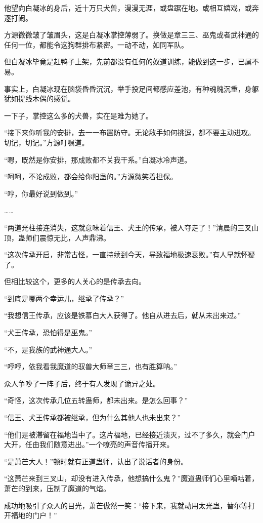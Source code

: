 \begin{this_body}
他望向白凝冰的身后，近十万只犬兽，漫漫无涯，或盘踞在地。或相互嬉戏，或奔逐打闹。

方源微微皱了皱眉头，这是白凝冰掌控薄弱了。换做是章三三、巫鬼或者武神通的任何一位，都能令这狗群排布紧密。一动不动，如同军队。

但白凝冰毕竟是赶鸭子上架，先前都没有任何的奴道训练，能做到这一步，已属不易。

事实上，白凝冰现在脑袋昏昏沉沉，举手投足间都感应差池，有种魂魄沉重，身躯犹如提线木偶的感觉。

一下子，掌控这么多的犬兽，实在是难为她了。

“接下来你听我的安排，去一一布置防守。无论敌手如何挑逗，都不要主动进攻。切记，切记。”方源叮嘱道。

“嗯，既然是你安排，那成败都不关我干系。”白凝冰冷声道。

“呵呵，不论成败，都会给你阳蛊的。”方源微笑着担保。

“哼，你最好说到做到。”

……

“两道光柱接连消失，这就意味着信王、犬王的传承，被人夺走了！”清晨的三叉山顶，蛊师们震惊无比，人声鼎沸。

“这次传承开启，非常古怪，一直持续到今天，导致福地极速衰败。”有人早就怀疑了。

但相比较这个，更多的人关心的是传承去向。

“到底是哪两个幸运儿，继承了传承？”

“我想信王传承，应该是铁慕白大人获得了。他自从进去后，就从未出来过。”

“犬王传承，恐怕得是巫鬼。”

“不，是我族的武神通大人。”

“哼哼，依我看我魔道的驭兽大师章三三，也有胜算呐。”

众人争吵了一阵子后，终于有人发现了诡异之处。

“奇怪，这次传承几位五转蛊师，都未出来。是怎么回事？”

“信王、犬王传承都被继承，但为什么其他人也未出来？”

“他们是被滞留在福地当中了。这片福地，已经接近溃灭，过不了多久，就会门户大开，任由我们随意进出。”一个嘹亮的声音传播开来。

“是萧芒大人！”顿时就有正道蛊师，认出了说话者的身份。

“这萧芒来到三叉山，却没有进入传承，他想搞什么鬼？”魔道蛊师们心里嘀咕着，萧芒的到来，压制了魔道的气焰。

成功地吸引了众人的目光，萧芒傲然一笑：“接下来，我就动用太光蛊，替尔等打开福地的门户！”


\end{this_body}
